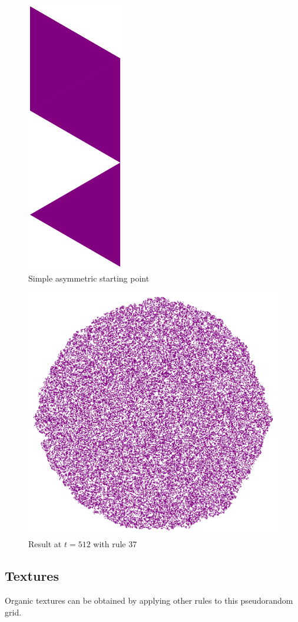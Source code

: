 \documentclass{article}
\begin{document}
\vspace{1cm}

\begin{figure}[H]
    \centering
    \includegraphics[width=.07\textwidth]{graphics/behavior/noise/rule-37-time-0-asymmetric.pdf}
    \caption{Simple asymmetric starting point}
    \label{fig:rule-37-time-0-asymmetric}
\end{figure}

\begin{figure}[H]
    \centering
    \includegraphics[width=.9\textwidth]{graphics/behavior/noise/rule-37-time-512-asymmetric.pdf}
    \caption{Result at $t=512$ with rule 37}
    \label{fig:rule-37-time-512-asymmetric}
\end{figure}


\pagebreak
\subsection{Textures} \label{textures}
Organic textures can be obtained by applying other rules to this pseudorandom grid.
\end{document}
